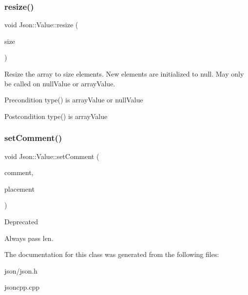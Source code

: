 \subsubsection{\texorpdfstring{resize()}{resize()}}
{\footnotesize\ttfamily void Json\+::\+Value\+::resize (\begin{DoxyParamCaption}\item[{Array\+Index}]{size }\end{DoxyParamCaption})}

Resize the array to size elements. New elements are initialized to null. May only be called on null\+Value or array\+Value. \begin{DoxyPrecond}{Precondition}
type() is array\+Value or null\+Value 
\end{DoxyPrecond}
\begin{DoxyPostcond}{Postcondition}
type() is array\+Value 
\end{DoxyPostcond}
\mbox{\label{classJson_1_1Value_a29f3a30f7e5d3af6f38d57999bf5b480}} 
\subsubsection{\texorpdfstring{set\+Comment()}{setComment()}}
{\footnotesize\ttfamily void Json\+::\+Value\+::set\+Comment (\begin{DoxyParamCaption}\item[{const char $\ast$}]{comment,  }\item[{\hyperlink{namespaceJson_a4fc417c23905b2ae9e2c47d197a45351}{Comment\+Placement}}]{placement }\end{DoxyParamCaption})}

\begin{DoxyRefDesc}{Deprecated}
\item[\hyperlink{deprecated__deprecated000003}{Deprecated}]Always pass len. \end{DoxyRefDesc}


The documentation for this class was generated from the following files\+:\begin{DoxyCompactItemize}
\item 
json/json.\+h\item 
jsoncpp.\+cpp\end{DoxyCompactItemize}
